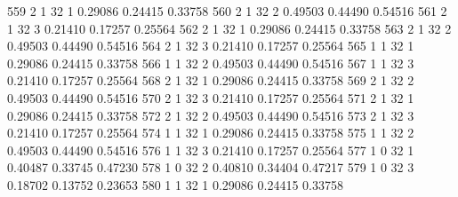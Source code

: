 \documentclass{article}
\begin{document}
\begin{Woutput}
 559      2       1      32       1       0.29086    0.24415    0.33758
 560      2       1      32       2       0.49503    0.44490    0.54516
 561      2       1      32       3       0.21410    0.17257    0.25564
 562      2       1      32       1       0.29086    0.24415    0.33758
 563      2       1      32       2       0.49503    0.44490    0.54516
 564      2       1      32       3       0.21410    0.17257    0.25564
 565      1       1      32       1       0.29086    0.24415    0.33758
 566      1       1      32       2       0.49503    0.44490    0.54516
 567      1       1      32       3       0.21410    0.17257    0.25564
 568      2       1      32       1       0.29086    0.24415    0.33758
 569      2       1      32       2       0.49503    0.44490    0.54516
 570      2       1      32       3       0.21410    0.17257    0.25564
 571      2       1      32       1       0.29086    0.24415    0.33758
 572      2       1      32       2       0.49503    0.44490    0.54516
 573      2       1      32       3       0.21410    0.17257    0.25564
 574      1       1      32       1       0.29086    0.24415    0.33758
 575      1       1      32       2       0.49503    0.44490    0.54516
 576      1       1      32       3       0.21410    0.17257    0.25564
 577      1       0      32       1       0.40487    0.33745    0.47230
 578      1       0      32       2       0.40810    0.34404    0.47217
 579      1       0      32       3       0.18702    0.13752    0.23653
 580      1       1      32       1       0.29086    0.24415    0.33758


\end{Woutput}
\end{document}
